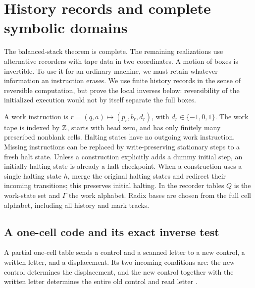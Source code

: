 \section{History records and complete symbolic domains}
\label{sec:bb-frontiers}

The balanced-stack theorem is complete.  The remaining realizations
use alternative recorders with tape data in two coordinates.
A motion of boxes is invertible.  To use it for an ordinary machine,
we must retain whatever information an instruction erases.  We use
finite history records in the sense of reversible computation, but
prove the local inverses below: reversibility of the initialized
execution would not by itself separate the full boxes.

A work instruction is $r=(q,a)\mapsto(p_r,b_r,d_r)$, with
$d_r\in\{-1,0,1\}$.  The work tape is indexed by $\mathbb Z$, starts with
head zero, and has only finitely many prescribed nonblank cells.
Halting states have no outgoing work instruction.  Missing instructions
can be replaced by write-preserving stationary steps to a fresh halt
state.  Unless a construction explicitly adds a dummy initial step,
an initially halting state is already a halt checkpoint. When a construction
uses a single halting state $h$, merge the original halting states and
redirect their incoming transitions; this preserves initial halting. In
the recorder tables $Q$ is the work-state set and $\Gamma$ the work
alphabet. Radix bases are chosen from the full cell alphabet, including
all history and mark tracks.

\subsection{A one-cell code and its exact inverse test}

A partial one-cell table sends a control and a scanned letter to a
new control, a written letter, and a displacement.  Its two incoming
conditions are: the new control determines the displacement, and the
new control together with the written letter determines the entire
old control and read letter \cite{AxelsenGluck2011,Morita2017}.

